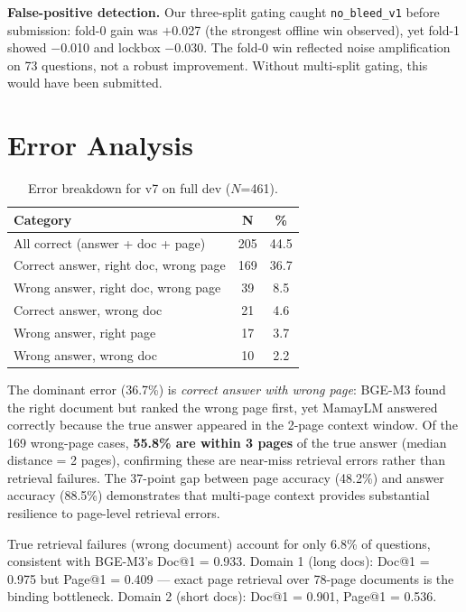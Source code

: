 \documentclass[11pt]{article}
\begin{document}
\textbf{False-positive detection.} Our three-split gating caught \texttt{no\_bleed\_v1} before submission: fold-0 gain was $+$0.027 (the strongest offline win observed), yet fold-1 showed $-$0.010 and lockbox $-$0.030. The fold-0 win reflected noise amplification on 73 questions, not a robust improvement. Without multi-split gating, this would have been submitted.

\section{Error Analysis}
\label{sec:error}

\begin{table}[t]
\centering
\small
\begin{tabular}{lcc}
\toprule
\textbf{Category} & \textbf{N} & \textbf{\%} \\
\midrule
All correct (answer + doc + page) & 205 & 44.5 \\
Correct answer, right doc, wrong page & 169 & 36.7 \\
Wrong answer, right doc, wrong page & 39 & 8.5 \\
Correct answer, wrong doc & 21 & 4.6 \\
Wrong answer, right page & 17 & 3.7 \\
Wrong answer, wrong doc & 10 & 2.2 \\
\bottomrule
\end{tabular}
\caption{Error breakdown for v7 on full dev ($N$=461).}
\label{tab:errors}
\end{table}

The dominant error (36.7\%) is \textit{correct answer with wrong page}: BGE-M3 found the right document but ranked the wrong page first, yet MamayLM answered correctly because the true answer appeared in the 2-page context window.
Of the 169 wrong-page cases, \textbf{55.8\% are within 3 pages} of the true answer (median distance = 2 pages), confirming these are near-miss retrieval errors rather than retrieval failures.
The 37-point gap between page accuracy (48.2\%) and answer accuracy (88.5\%) demonstrates that multi-page context provides substantial resilience to page-level retrieval errors.

True retrieval failures (wrong document) account for only 6.8\% of questions, consistent with BGE-M3's Doc@1 = 0.933.
Domain 1 (long docs): Doc@1 = 0.975 but Page@1 = 0.409 --- exact page retrieval over 78-page documents is the binding bottleneck.
Domain 2 (short docs): Doc@1 = 0.901, Page@1 = 0.536.
\end{document}
